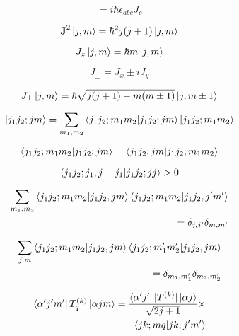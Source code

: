 \documentclass[11pt]{article}
\newcommand{\vect}[1]{\boldsymbol{\mathbf{#1}}}
\begin{document}
\begin{multicols}{2}
\begin{equation}
[J_a,J_b] = i \hbar \epsilon_{abc} J_c
\end{equation}

\begin{equation}
\vect{J}^2 \ket{j,m} = \hbar^2 j (j+1) \ket{j,m}
\end{equation}

\begin{equation}
J_z \ket{j,m} = \hbar m \ket{j,m}
\end{equation}

\begin{equation}
J_{\pm} = J_x \pm i J_y
\end{equation}

\begin{equation}
J_{\pm} \ket{j,m} = \hbar \sqrt{j(j+1)-m(m\pm1)} \ket{j,m\pm1}
\end{equation}

\begin{equation}
\ket{j_1j_2;jm} =
 \sum_{m_1,m_2} \braket{j_1j_2;m_1m_2|j_1j_2;jm} \ket{j_1j_2;m_1m_2}
\end{equation}

\begin{equation}
\braket{j_1j_2;m_1m_2|j_1j_2;jm}
 = \braket{j_1j_2;jm|j_1j_2;m_1m_2}
\end{equation}

\begin{equation}
\braket{j_1j_2;j_1,j-j_1|j_1j_2;jj} > 0
\end{equation}

\begin{equation}
\begin{split}
\sum_{m_1,m_2} \braket{j_1j_2;m_1m_2|j_1j_2,jm} \braket{j_1j_2;m_1m_2|j_1j_2,j'm'} \\ = \delta_{j,j'}\delta_{m,m'}
\end{split}
\end{equation}

\begin{equation}
\begin{split}
\sum_{j,m} \braket{j_1j_2;m_1m_2|j_1j_2,jm} \braket{j_1j_2;m_1'm_2'|j_1j_2,jm} \\ = \delta_{m_1,m_1'}\delta_{m_2,m_2'}
\end{split}
\end{equation}

\begin{equation}
\begin{split}
\bra{\alpha' j' m'}T^{(k)}_q\ket{\alpha j m} =
  \frac{\bra{\alpha ' j'}|T^{(k)}|\ket{\alpha j}}{\sqrt{2j+1}} \times \\
  \braket{jk;mq|jk;j'm'}
\end{split}
\end{equation}


\end{multicols}
\end{document}

